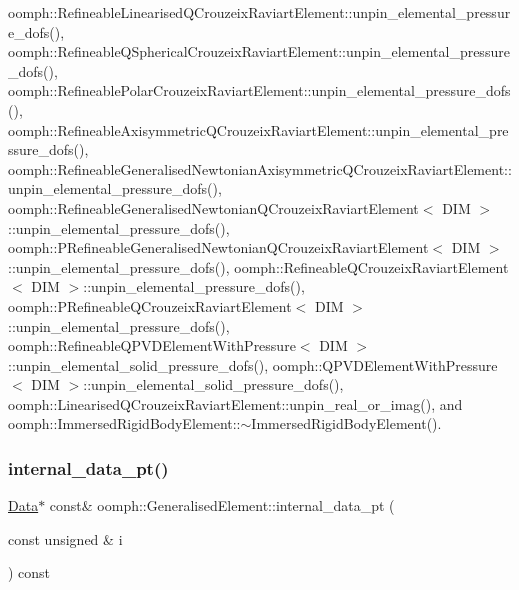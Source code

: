 oomph\+::\+Refineable\+Linearised\+Q\+Crouzeix\+Raviart\+Element\+::unpin\+\_\+elemental\+\_\+pressure\+\_\+dofs(), oomph\+::\+Refineable\+Q\+Spherical\+Crouzeix\+Raviart\+Element\+::unpin\+\_\+elemental\+\_\+pressure\+\_\+dofs(), oomph\+::\+Refineable\+Polar\+Crouzeix\+Raviart\+Element\+::unpin\+\_\+elemental\+\_\+pressure\+\_\+dofs(), oomph\+::\+Refineable\+Axisymmetric\+Q\+Crouzeix\+Raviart\+Element\+::unpin\+\_\+elemental\+\_\+pressure\+\_\+dofs(), oomph\+::\+Refineable\+Generalised\+Newtonian\+Axisymmetric\+Q\+Crouzeix\+Raviart\+Element\+::unpin\+\_\+elemental\+\_\+pressure\+\_\+dofs(), oomph\+::\+Refineable\+Generalised\+Newtonian\+Q\+Crouzeix\+Raviart\+Element$<$ D\+I\+M $>$\+::unpin\+\_\+elemental\+\_\+pressure\+\_\+dofs(), oomph\+::\+P\+Refineable\+Generalised\+Newtonian\+Q\+Crouzeix\+Raviart\+Element$<$ D\+I\+M $>$\+::unpin\+\_\+elemental\+\_\+pressure\+\_\+dofs(), oomph\+::\+Refineable\+Q\+Crouzeix\+Raviart\+Element$<$ D\+I\+M $>$\+::unpin\+\_\+elemental\+\_\+pressure\+\_\+dofs(), oomph\+::\+P\+Refineable\+Q\+Crouzeix\+Raviart\+Element$<$ D\+I\+M $>$\+::unpin\+\_\+elemental\+\_\+pressure\+\_\+dofs(), oomph\+::\+Refineable\+Q\+P\+V\+D\+Element\+With\+Pressure$<$ D\+I\+M $>$\+::unpin\+\_\+elemental\+\_\+solid\+\_\+pressure\+\_\+dofs(), oomph\+::\+Q\+P\+V\+D\+Element\+With\+Pressure$<$ D\+I\+M $>$\+::unpin\+\_\+elemental\+\_\+solid\+\_\+pressure\+\_\+dofs(), oomph\+::\+Linearised\+Q\+Crouzeix\+Raviart\+Element\+::unpin\+\_\+real\+\_\+or\+\_\+imag(), and oomph\+::\+Immersed\+Rigid\+Body\+Element\+::$\sim$\+Immersed\+Rigid\+Body\+Element().

\mbox{\label{classoomph_1_1GeneralisedElement_a21ff163046aeaab67983e4c862a78d17}} 
\subsubsection{\texorpdfstring{internal\+\_\+data\+\_\+pt()}{internal\_data\_pt()}\hspace{0.1cm}{\footnotesize\ttfamily [2/2]}}
{\footnotesize\ttfamily \hyperlink{classoomph_1_1Data}{Data}$\ast$ const\& oomph\+::\+Generalised\+Element\+::internal\+\_\+data\+\_\+pt (\begin{DoxyParamCaption}\item[{const unsigned \&}]{i }\end{DoxyParamCaption}) const\hspace{0.3cm}{\ttfamily [inline]}}



